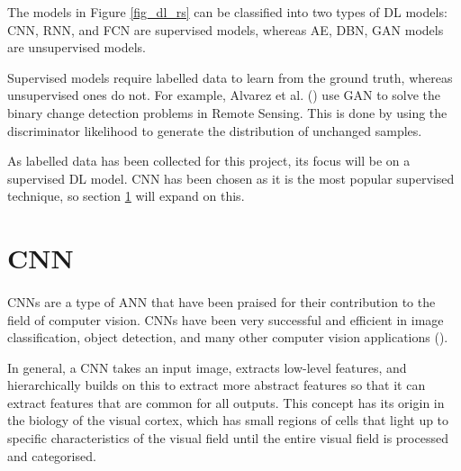 The models in Figure \ref{fig_dl_rs} can be classified into two types of \gls{DL} models: \gls{CNN}, \gls{RNN}, and \gls{FCN} are supervised models, whereas \gls{AE}, \gls{DBN}, \gls{GAN} models are unsupervised models. 

Supervised models require labelled data to learn from the ground truth, whereas unsupervised ones do not.  For example, Alvarez et al. (\cite{alvarez2020s2cgan}) use \gls{GAN} to solve the binary change detection problems in Remote Sensing. This is done by using the discriminator likelihood to generate the distribution of unchanged samples.

As labelled data has been collected for this project, its focus will be on a supervised \gls{DL} model. \gls{CNN} has been chosen as it is the most popular supervised technique, so section \ref{cnn_sect} will expand on this.



\section{\gls{CNN}} \label{cnn_sect}
\paragraph{}
\gls{CNN}s are a type of \gls{ANN} that have been praised for their contribution to the field of computer vision. \gls{CNN}s have been very successful and efficient in image classification, object detection, and many other computer vision applications (\cite{GoodBengCour16}).

In general, a \gls{CNN} takes an input image, extracts low-level features, and hierarchically builds on this to extract more abstract features so that it can extract features that are common for all outputs. This concept has its origin in the biology of the visual cortex, which has small regions of cells that light up to specific characteristics of the visual field until the entire visual field is processed and categorised.


